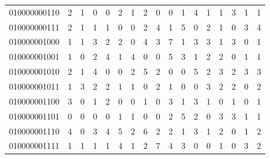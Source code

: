 \documentclass[10pt,a4paper]{article}
\begin{document}
\begin{longtable}{ |c|c|c|c|c|c|c|c|c|c|c|c|c|c|c|c|c| }
    010000000110              & 2                            & 1                                & 0                            & 0                              & 2   & 1   & 2   & 0   & 0   & 1   & 4   & 1   & 1   & 3   & 1   & 1   \\
    010000000111              & 2                            & 1                                & 1                            & 1                              & 0   & 0   & 2   & 4   & 1   & 5   & 0   & 2   & 1   & 0   & 3   & 4   \\
    010000001000              & 1                            & 1                                & 3                            & 2                              & 2   & 0   & 4   & 3   & 7   & 1   & 3   & 3   & 1   & 3   & 0   & 1   \\
    010000001001              & 1                            & 0                                & 2                            & 4                              & 1   & 4   & 0   & 0   & 5   & 3   & 1   & 2   & 2   & 0   & 1   & 1   \\
    010000001010              & 2                            & 1                                & 4                            & 0                              & 0   & 2   & 5   & 2   & 0   & 0   & 5   & 2   & 3   & 2   & 3   & 3   \\
    010000001011              & 1                            & 3                                & 2                            & 2                              & 1   & 1   & 0   & 2   & 1   & 0   & 0   & 3   & 2   & 2   & 0   & 2   \\
    010000001100              & 3                            & 0                                & 1                            & 2                              & 0   & 0   & 1   & 0   & 3   & 1   & 3   & 1   & 0   & 1   & 0   & 1   \\
    010000001101              & 0                            & 0                                & 0                            & 0                              & 1   & 1   & 0   & 0   & 2   & 5   & 2   & 0   & 3   & 3   & 1   & 1   \\
    010000001110              & 4                            & 0                                & 3                            & 4                              & 5   & 2   & 6   & 2   & 2   & 1   & 3   & 1   & 2   & 0   & 1   & 2   \\
    010000001111              & 1                            & 1                                & 1                            & 1                              & 4   & 1   & 2   & 7   & 4   & 3   & 0   & 0   & 1   & 0   & 3   & 2   \\

\end{longtable}
\end{document}
